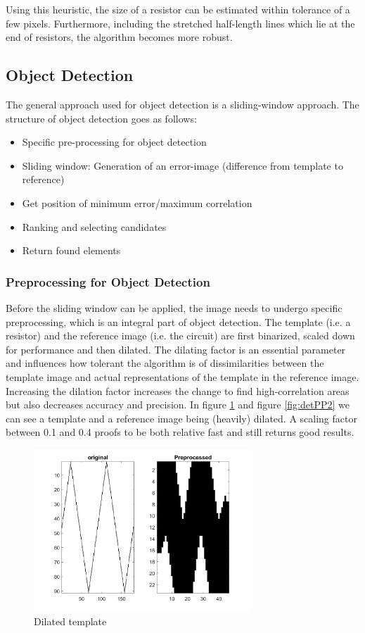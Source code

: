 \documentclass[10pt,twocolumn,letterpaper]{article}
\begin{document}
\par
Using this heuristic, the size of a resistor can be estimated within tolerance of a few pixels. Furthermore, including the stretched half-length lines which lie at the end of resistors, the algorithm becomes more robust.

\subsection{Object Detection}
\label{subsec:obj}

The general approach used for object detection is a sliding-window approach. The structure of object detection goes as follows: 
\begin{itemize}
	\item Specific pre-processing for object detection
	\item Sliding window: Generation of an error-image (difference from template to reference)
	\item Get position of minimum error/maximum correlation
	\item Ranking and selecting candidates
	\item Return found elements
\end{itemize}

\subsubsection*{Preprocessing for Object Detection}

Before the sliding window can be applied, the image needs to undergo specific preprocessing, which is an integral part of object detection. The template (i.e. a resistor) and the reference image (i.e. the circuit) are first binarized, scaled down for performance and then dilated. The dilating factor is an essential parameter and influences how tolerant the algorithm is of dissimilarities between the template image and actual representations of the template in the reference image. Increasing the dilation factor increases the change to find high-correlation areas but also decreases accuracy and precision. In figure \ref{fig:detPP1} and figure \ref{fig:detPP2} we can see a template and a reference image being (heavily) dilated. A scaling factor between 0.1 and 0.4 proofs to be both relative fast and still returns good results.
\par

\begin{figure}[!ht]
\includegraphics[width = 3.2in]{img/detPP1.png}
\caption{Dilated template}
\label{fig:detPP1}
\end{figure}
\par
\end{document}
